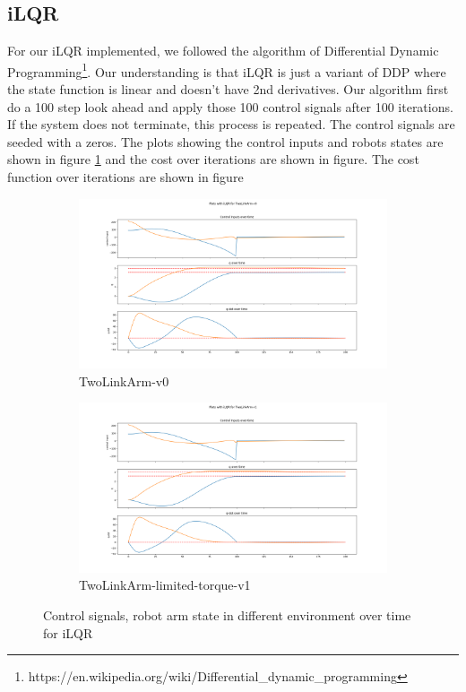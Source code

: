 \documentclass[hidelinks]{scrartcl}
\begin{document}
\subsection*{iLQR}
For our iLQR implemented, we followed the algorithm of Differential Dynamic Programming\footnote{https://en.wikipedia.org/wiki/Differential_dynamic_programming}. Our understanding is that iLQR is just a variant of DDP where the state function is linear and doesn't have 2nd derivatives. Our algorithm first do a 100 step look ahead and apply those 100 control signals after 100 iterations. If the system does not terminate, this process is repeated. The control signals are seeded with a zeros. The plots showing the control inputs and robots states are shown in figure \ref{fig:iLQR_state} and the cost over iterations are shown in figure. The cost function over iterations are shown in figure
\begin{figure}[H]
	\centering
    \begin{subfigure}[b]{0.45\textwidth}
        \includegraphics[width=\textwidth]{figures/ilqr_two_link-v0}
        \caption{TwoLinkArm-v0}
    \end{subfigure}
    \begin{subfigure}[b]{0.45\textwidth}
        \includegraphics[width=\textwidth]{figures/ilqr_two_link-v1}
        \caption{TwoLinkArm-limited-torque-v1}
    \end{subfigure}
    \caption{Control signals, robot arm state in different environment over time for iLQR}\label{fig:iLQR_state}
\end{figure}
\end{document}
